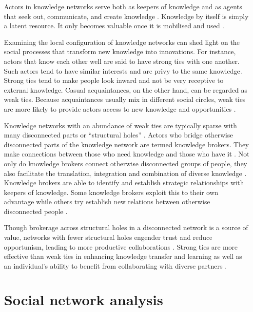 Actors in knowledge networks serve both as keepers of knowledge and as agents that seek out, communicate, and create knowledge \citep{phelps2012knowledge,pugh2013designing}. Knowledge by itself is simply a latent resource. It only becomes valuable once it is mobilised and used \citep{marabelli2012knowledge,freeman2015knowledge}. 

Examining the local configuration of knowledge networks can shed light on the social processes that transform new knowledge into innovations. For instance, actors that know each other well are said to have strong ties with one another. Such actors tend to have similar interests and are privy to the same knowledge. Strong ties tend to make people look inward and not be very receptive to external knowledge. Casual acquaintances, on the other hand, can be regarded as weak ties. Because acquaintances usually mix in different social circles, weak ties are more likely to provide actors access to new knowledge and opportunities \citep{granovetter1973strength}. \medskip

Knowledge networks with an abundance of weak ties are typically sparse with many disconnected parts or \enquote{structural holes} \citep{burt1992structural}. Actors who bridge otherwise disconnected parts of the knowledge network are termed knowledge brokers. They make connections between those who need knowledge and those who have it \citep{davenport1998successful}. Not only do knowledge brokers connect otherwise disconnected groups of people, they also facilitate the translation, integration and combination of diverse knowledge \citep{davis2010agency}.
Knowledge brokers are able to identify and establish strategic relationships with keepers of knowledge. Some knowledge brokers exploit this to their own advantage while others try establish new relations between otherwise disconnected people \citep{gould1989structures,burt1992structural,obstfeld2014brokerage}. \medskip

Though brokerage across structural holes in a disconnected network is a source of value, networks with fewer structural holes engender trust and reduce opportunism, leading to more productive collaborations \citep{ahuja2000collaboration}. Strong ties are more effective than weak ties in enhancing knowledge transfer and learning as well as an individual’s ability to benefit from collaborating with diverse partners \citep{rost2011strength,phelps2012knowledge,tortoriello2012bridging}. \medskip

\section{Social network analysis}

